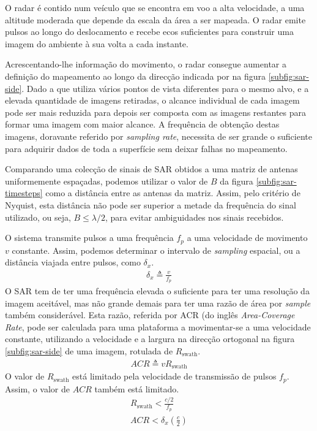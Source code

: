\documentclass[purist,portuguese]{ist-report}
\begin{document}
O radar é contido num veículo que se encontra em voo a alta velocidade, a uma altitude moderada que depende da escala da área a ser mapeada. O radar emite pulsos ao longo do deslocamento e recebe ecos suficientes para construir uma imagem do ambiente à sua volta a cada instante.

Acrescentando-lhe informação do movimento, o radar consegue aumentar a definição do mapeamento ao longo da direcção indicada por  na figura \ref{subfig:sar-side}. Dado a que utiliza vários pontos de vista diferentes para o mesmo alvo, e a elevada quantidade de imagens retiradas, o alcance individual de cada imagem pode ser mais reduzida para depois ser composta com as imagens restantes para formar uma imagem com maior alcance. A frequência de obtenção destas imagens, doravante referido por \textit{sampling rate}, necessita de ser grande o suficiente para adquirir dados de toda a superfície sem deixar falhas no mapeamento.

Comparando uma colecção de sinais de SAR obtidos a uma matriz de antenas uniformemente espaçadas, podemos utilizar o valor de $B$ da figura \ref{subfig:sar-timesteps} como a distância entre as antenas da matriz. Assim, pelo critério de Nyquist, esta distância não pode ser superior a metade da frequência do sinal utilizado, ou seja, $B \leq \lambda/ 2$, para evitar ambiguidades nos sinais recebidos.

O sistema transmite pulsos a uma frequência $f_p$ a uma velocidade de movimento $v$ constante. Assim, podemos determinar o intervalo de \textit{sampling} espacial, ou a distância viajada entre pulsos, como $\delta_x$.
\begin{gather*}
	\delta_x \triangleq \frac{v}{f_p}
\end{gather*}
O SAR tem de ter uma frequência elevada o suficiente para ter uma resolução da imagem aceitável, mas não grande demais para ter uma razão de área por \textit{sample} também considerável. Esta razão, referida por ACR (do inglês \textit{Area-Coverage Rate}, pode ser calculada para uma plataforma a movimentar-se a uma velocidade constante, utilizando a velocidade e a largura na direcção ortogonal  na figura \ref{subfig:sar-side} de uma imagem, rotulada de $R_{\textrm{swath}}$.
\begin{gather*}
	ACR \triangleq vR_{\textrm{swath}}
\end{gather*}
O valor de $R_{\textrm{swath}}$ está limitado pela velocidade de transmissão de pulsos $f_p$. Assim, o valor de $ACR$ também está limitado.
\begin{gather*}
	R_{\textrm{swath}} < \frac{c/2}{f_p} \\
	ACR < \delta_x\left(\frac{c}{2}\right)
\end{gather*}
\end{document}
